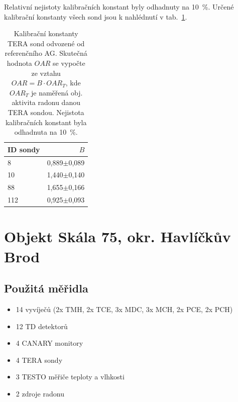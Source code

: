 Relativní nejistoty kalibračních konstant byly odhadnuty na 10~\%. Určené kalibrační konstanty všech sond jsou k nahlédnutí v tab.~\ref{tab:dynMer_sondyB}. %
\begin{table}[ht]
	\centering
	\caption{Kalibrační konstanty TERA sond odvozené od referenčního AG. Skutečná hodnota $OAR$ se vypočte ze vztahu $OAR=B\cdot OAR_T$, kde $OAR_T$ je naměřená obj. aktivita radonu danou TERA sondou. Nejistota kalibračních konstant byla odhadnuta na 10~\%.}
	\label{tab:dynMer_sondyB}
	\begin{tabular}{lr}
		\toprule
		ID sondy &     $B$ \\
		\midrule
		8   & 0,889$\pm$0,089\\
		10  & 1,440$\pm$0,140\\
		88  & 1,655$\pm$0,166\\
		112 & 0,925$\pm$0,093\\
		\bottomrule
	\end{tabular}
\end{table}
\section{Objekt Skála 75, okr. Havlíčkův Brod}
\subsection{Použitá měřidla}
\begin{itemize}
    \setlength\itemsep{0em}
	\item 14 vyvíječů (2x TMH, 2x TCE, 3x MDC, 3x MCH, 2x PCE, 2x PCH)
	\item 12 TD detektorů
	\item 4 CANARY monitory
	\item 4 TERA sondy
	\item 3 TESTO měřiče teploty a vlhkosti
	\item 2 zdroje radonu
\end{itemize}

